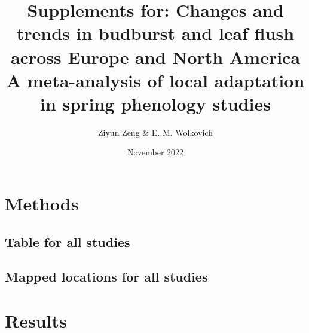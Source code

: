 \documentclass{article}
\begin{document}
\title{{\huge Supplements for: Changes and trends in budburst and leaf flush across Europe and North America} \\A meta-analysis of local adaptation in spring phenology studies}
\author{Ziyun Zeng \& E. M. Wolkovich}
\date{November 2022}
\maketitle 


\section*{Methods}
\subsection*{Table for all studies}
\subsection*{Mapped locations for all studies}

\section*{Results}
\end{document}
